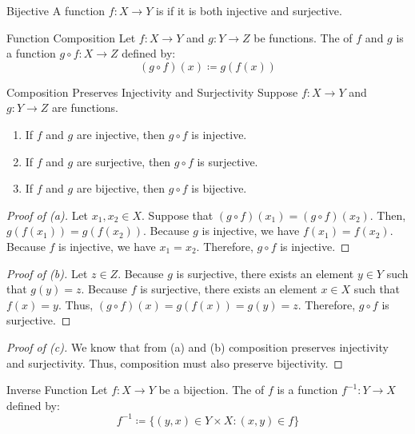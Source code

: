 \begin{dfnbox}{Bijective}{}
    A function $f : X \to Y$ is  if it is both injective and surjective.
\end{dfnbox}

\begin{dfnbox}{Function Composition}{}
    Let $f : X \to Y$ and $g : Y \to Z$ be functions. The  of $f$ and $g$ is a function $g \circ f : X \to Z$ defined by:
    \[ (g \circ f) (x) \coloneq g(f(x)) \]
\end{dfnbox}

\begin{thmbox}{Composition Preserves Injectivity and Surjectivity}{}
    Suppose $f : X \to Y$ and $g : Y \to Z$ are functions.
    \begin{enumerate}[label=(\alph*)]
        \item If $f$ and $g$ are injective, then $g \circ f$ is injective.
        \item If $f$ and $g$ are surjective, then $g \circ f$ is surjective.
        \item If $f$ and $g$ are bijective, then $g \circ f$ is bijective.
    \end{enumerate}
    \tcblower
    \begin{proof}[Proof of (a)]
        Let $x_1, x_2 \in X$. Suppose that $(g \circ f)(x_1) = (g \circ f)(x_2)$. Then, $g(f(x_1)) = g(f(x_2))$. Because $g$ is injective, we have $f(x_1) = f(x_2)$. Because $f$ is injective, we have $x_1 = x_2$. Therefore, $g \circ f$ is injective.
    \end{proof}

    \begin{proof}[Proof of (b)]
        Let $z \in Z$. Because $g$ is surjective, there exists an element $y \in Y$ such that $g(y) = z$. Because $f$ is surjective, there exists an element $x \in X$ such that $f(x) = y$. Thus, $(g \circ f)(x) = g(f(x)) = g(y) = z$. Therefore, $g \circ f$ is surjective.
    \end{proof}

    \begin{proof}[Proof of (c)]
        We know that from (a) and (b) composition preserves injectivity and surjectivity. Thus, composition must also preserve bijectivity.
    \end{proof}
\end{thmbox}

\begin{dfnbox}{Inverse Function}{}
    Let $f : X \to Y$ be a bijection. The  of $f$ is a function $f^{-1} : Y \to X$ defined by:
    \[ f^{-1} \coloneq \{ (y,x) \in Y \times X : (x,y) \in f \} \]
\end{dfnbox}

